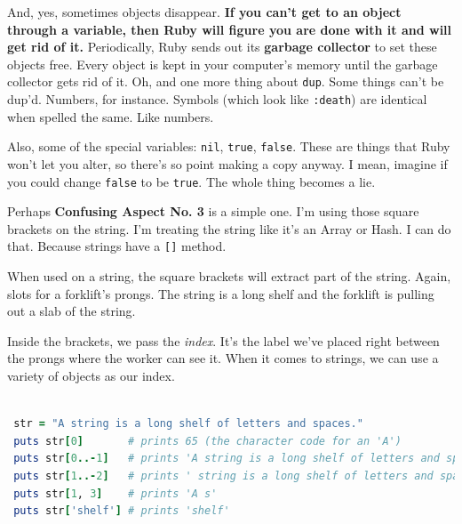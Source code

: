 \documentclass[10pt,twoside]{report}
\begin{document}
And, yes, sometimes objects disappear.  {\bf If you can't get to an
  object through a variable, then Ruby will figure you are done with
  it and will get rid of it.}  Periodically, Ruby sends out its {\bf
  garbage collector} to set these objects free.  Every object is kept
in your computer's memory until the garbage collector gets rid of it.
Oh, and one more thing about \lstinline[breaklines=true]|dup|.  Some
things can't be dup'd.  Numbers, for instance.  Symbols (which look
like \lstinline[breaklines=true]|:death|) are identical when spelled
the same.  Like numbers.

Also, some of the special variables: \lstinline[breaklines=true]|nil|,
\lstinline[breaklines=true]|true|, \lstinline[breaklines=true]|false|.
These are things that Ruby won't let you alter, so there's so point
making a copy anyway.  I mean, imagine if you could change
\lstinline[breaklines=true]|false| to be
\lstinline[breaklines=true]|true|.  The whole thing becomes a lie.

Perhaps {\bf Confusing Aspect No. 3} is a simple one.  I'm using those
square brackets on the string.  I'm treating the string like it's an
Array or Hash.  I can do that.  Because strings have a
\lstinline[breaklines=true]|[]| method.

When used on a string, the square brackets will extract part of the
string.  Again, slots for a forklift's prongs.  The string is a long
shelf and the forklift is pulling out a slab of the string.

Inside the brackets, we pass the {\em index}.  It's the label we've
placed right between the prongs where the worker can see it.  When it
comes to strings, we can use a variety of objects as our index.


\begin{lstlisting}[basicstyle=\ttfamily\color{basiccolor},
    commentstyle = \ttfamily\color{commentcolor},
    keywordstyle=\ttfamily\color{keywordscolor},
    stringstyle=\color{stringcolor},
    language=Ruby,
    basicstyle=\small\ttfamily,
    showstringspaces=false,
  ]

 str = "A string is a long shelf of letters and spaces."
 puts str[0]       # prints 65 (the character code for an 'A')
 puts str[0..-1]   # prints 'A string is a long shelf of letters and spaces.'
 puts str[1..-2]   # prints ' string is a long shelf of letters and spaces'
 puts str[1, 3]    # prints 'A s'
 puts str['shelf'] # prints 'shelf'

\end{lstlisting}
\end{document}
